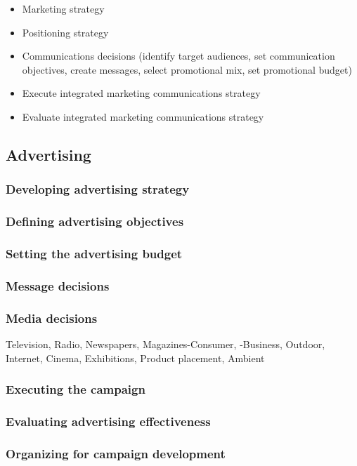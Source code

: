 \documentclass{article}
\begin{document}
\begin{itemize}
    \item Marketing strategy
    \item Positioning strategy
    \item Communications decisions (identify target audiences, set communication objectives, create messages, select promotional mix, set promotional budget)
    \item Execute integrated marketing communications strategy
    \item Evaluate integrated marketing communications strategy
\end{itemize}

\subsection{Advertising}
\subsubsection*{Developing advertising strategy}
\subsubsection*{Defining advertising objectives}
\subsubsection*{Setting the advertising budget}
\subsubsection*{Message decisions}
\subsubsection*{Media decisions}
Television, Radio, Newspapers, Magazines-Consumer, -Business, Outdoor, Internet, Cinema, Exhibitions, Product placement, Ambient
\subsubsection*{Executing the campaign}
\subsubsection*{Evaluating advertising effectiveness}
\subsubsection*{Organizing for campaign development}
\end{document}
